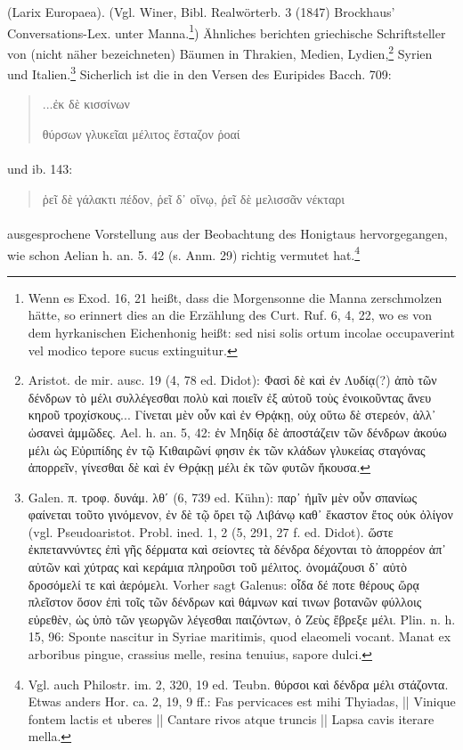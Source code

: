 \documentclass[a4paper, 11pt, oneside]{article}
\begin{document}
(Larix Europaea). (Vgl. Winer, Bibl. Realwörterb. 3 (1847) Brockhaus' Conversations-Lex. unter Manna.\footnote{Wenn es Exod. 16, 21 heißt, dass die Morgensonne die Manna zerschmolzen hätte, so erinnert dies an die Erzählung des Curt. Ruf. 6, 4, 22, wo es von dem hyrkanischen Eichenhonig heißt: sed nisi solis ortum incolae occupaverint vel modico tepore sucus extinguitur.}) Ähnliches berichten griechische Schriftsteller von (nicht näher bezeichneten) Bäumen in Thrakien, Medien, Lydien,\footnote{Aristot. de mir. ausc. 19 (4, 78 ed. Didot): Φασὶ δὲ καὶ ἐν Λυδίᾳ(?) ἀπὸ τῶν δένδρων τὸ μέλι συλλέγεσθαι πολὺ καὶ ποιεῖν ἐξ αὐτοῦ τοὺς ἐνοικοῦντας ἄνευ κηροῦ τροχίσκους... Γίνεται μὲν οὖν καὶ ἐν Θρᾴκῃ, οὐχ οὕτω δὲ στερεόν, ἀλλ᾽ ὡσανεὶ ἀμμῶδες. Ael. h. an. 5, 42: ἐν Μηδίᾳ δὲ ἀποστάζειν τῶν δένδρων ἀκούω μέλι ὡς Εὐριπίδης ἐν τῷ Κιθαιρῶνί φησιν ἐκ τῶν κλάδων γλυκείας σταγόνας ἀπορρεῖν, γίνεσθαι δὲ καὶ ἐν Θρᾴκῃ μέλι ἐκ τῶν φυτῶν ἤκουσα.} Syrien und Italien.\footnote{Galen. π. τροφ. δυνάμ. λθʹ (6, 739 ed. Kühn): παρ᾽ ἡμῖν μὲν οὖν σπανίως φαίνεται τοῦτο γινόμενον, ἐν δὲ τῷ ὄρει τῷ Λιβάνῳ καθ᾽ ἕκαστον ἔτος οὐκ ὀλίγον (vgl. Pseudoaristot. Probl. ined. 1, 2 (5, 291, 27 f. ed. Didot). ὥστε ἐκπεταννύντες ἐπὶ γῆς δέρματα καὶ σείοντες τὰ δένδρα δέχονται τὸ ἀπορρέον ἀπ᾽ αὐτῶν καὶ χύτρας καὶ κεράμια πληροῦσι τοῦ μέλιτος. ὀνομάζουσι δ᾽ αὐτὸ δροσόμελί τε καὶ ἀερόμελι. Vorher sagt Galenus: οἷδα δέ ποτε θέρους ὥρᾳ πλεῖστον ὅσον ἐπὶ τοῖς τῶν δένδρων καὶ θάμνων καί τινων βοτανῶν φύλλοις εὐρεθὲν, ὡς ὑπὸ τῶν γεωργῶν λέγεσθαι παιζόντων, ὁ Ζεὺς ἔβρεξε μέλι. Plin. n. h. 15, 96: Sponte nascitur in Syriae maritimis, quod elaeomeli vocant. Manat ex arboribus pingue, crassius melle, resina tenuius, sapore dulci.} Sicherlich ist die in den Versen des Euripides Bacch. 709:
\begin{quotation}\large
...ἐκ δὲ κισσίνων

θύρσων γλυκεῖαι μέλιτος ἔσταζον ῥοαί
\end{quotation}
\paragraph{}
und ib. 143:
\begin{quotation}\large
ῥεῖ δὲ γάλακτι πέδον, ῥεῖ δ᾽ οἴνῳ, ῥεῖ δὲ μελισσᾶν νέκταρι
\end{quotation}
\paragraph{}
ausgesprochene Vorstellung aus der Beobachtung des Honigtaus hervorgegangen, wie schon Aelian h. an. 5. 42 (s. Anm. 29) richtig vermutet hat.\footnote{Vgl. auch Philostr. im. 2, 320, 19 ed. Teubn. θύρσοι καὶ δένδρα μέλι στάζοντα. Etwas anders Hor. ca. 2, 19, 9 ff.: Fas pervicaces est mihi Thyiadas, || Vinique fontem lactis et uberes || Cantare rivos atque truncis || Lapsa cavis iterare mella.}
\end{document}
